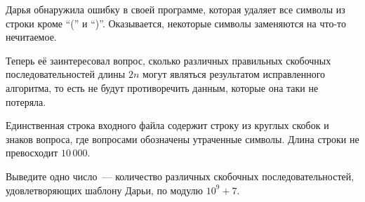 Дарья обнаружила ошибку в своей программе, которая удаляет все символы из
строки кроме ``('' и ``)''. Оказывается, некоторые символы заменяются на что-то
нечитаемое.

Теперь её заинтересовал вопрос, сколько различных правильных скобочных
последовательностей длины $2n$ могут являться результатом исправленного
алгоритма, то есть не будут противоречить данным, которые она таки не потеряла.

\InputFile

Единственная строка входного файла содержит строку из круглых скобок и знаков
вопроса, где вопросами
обозначены утраченные символы. Длина строки не превосходит $10\,000$.

\OutputFile

Выведите одно число~--- количество различных скобочных последовательностей,
удовлетворяющих шаблону Дарьи, по модулю $10^9+7$.

\SAMPLES
